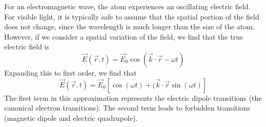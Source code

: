 For an electromagnetic wave, the atom experiences an oscillating electric field.  
For visible light, it is typically safe to assume that the spatial portion of 
the field does not change, since the wavelength is much longer than the size of 
the atom.  However, if we consider a spatial variation of the field, we find 
that the true electric field is
\begin{equation}
    \vec{E}(\vec{r},t) = \vec{E}_0 \cos (\vec{k}\cdot \vec{r} - \omega t)
\end{equation}
Expanding this to first order, we find that
\begin{equation}
    \vec{E}(\vec{r},t) = \vec{E}_0 [\cos (\omega t) + (\vec{k} \cdot \vec{r} \sin (\omega t)]
\end{equation}
The first term in this approximation represents the electric dipole transitions 
(the canonical electron transitions).  The second term leads to forbidden 
transitions (magnetic dipole and electric quadrupole).






